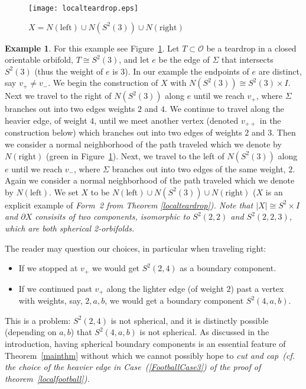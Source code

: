\documentclass[12pt,reqno]{amsart}
\theoremstyle{plain}
\theoremstyle{definition}
\numberwithin{subcase}{case}
\theoremstyle{plain}
\theoremstyle{definition}
\newtheorem{ex}[thm]{Example}
\def\scl[#1][#2]{{\scalebox{#1}{#2}}}
\def\vpp{v_{++}}
\def\vp{v_{+}}
\def\vm{v_{-}}
\newcommand{\OO}{\mathcal{O}}
\begin{document}
\begin{figure}[h!]
\psfrag{s}{\scl[.7][$T \cong S^2\left(3\right)$]}
\psfrag{2}{\scl[.7][$2$]}
\psfrag{3}{\scl[.7][$3$]}
\psfrag{4}{\scl[.7][$4$]}
\psfrag{r}{\scl[.7][$N\left(\text{right}\right)$]}
\psfrag{l}{\scl[.7][$N\left(\text{left}\right)$]}
\centerline{\texttt{[image: localteardrop.eps]}}
\caption{$X=N\left(\text{left}\right)\cup 
N\left(S^{2}(3)\right)
\cup N\left(\text{right}\right)$}
\label{teardropex}
\end{figure}
\begin{ex}
For this example see Figure~\ref{teardropex}. 
Let \(T \subset \OO\) be a teardrop in a closed orientable orbifold, \(T \cong S^{2}(3)\), and let \(e\) be the edge of \(\Sigma\) that intersects \(S^{2}(3)\) (thus the weight of \(e\) is 3).  In our example the endpoints of \(e\) are distinct, say \(\vp \neq \vm\).
We begin the construction of \(X\) with \(N\left(S^{2}(3)\right) \cong S^{2}(3) \times I\).  Next we travel to the right of $N\left(S^{2}(3)\right)$ along $e$ until we reach \(\vp\), where \(\Sigma\) branches out into two edges weights $2$ and $4$. We continue to travel along the heavier edge, of weight $4$, until we meet another vertex 
(denoted \(\vpp\) in the construction below) 
which branches out into two edges of weights $2$ and $3$.
Then we consider a normal neighborhood of the path traveled which we denote by $N(\text{right})$ (green in Figure~\ref{teardropex}). Next, we travel to the left of $N\left(S^{2}(3)\right)$ along $e$ until we reach \(\vm\), where \(\Sigma\) branches out into two edges of the same weight, $2$. Again we consider a normal neighborhood of the path traveled which we denote by $N(\text{left})$.
We set $X$ to be $N(\text{left}) \cup N\left(S^{2}(3)\right) \cup N(\text{right})$ (\(X\) is an explicit example of \em Form~2 \em from Theorem \ref{localteardrop}). Note that $|X| \cong S^2\times I$ and $\partial X$ consisits of two components, isomorphic to $S^2(2,2)$ and $S^2(2,2,3)$, which are both spherical 2-orbifolds.  

The reader may question our choices, in particular when traveling right: 
\begin{itemize}
\item If we stopped at \(\vp\) we would get  \(S^{2}(2,4)\) as a boundary component.
\item If we continued past \(\vp\) along the lighter edge (of weight \(2\)) past a vertex with weights, say, \(2,a,b\), we would get a boundary component \(S^{2}(4,a,b)\).  
\end{itemize}
This is a problem: \(S^{2}(2,4)\) is not spherical, and it is distinctly possible (depending on \(a,b\)) that \(S^{2}(4,a,b)\) is not spherical.  As discussed in the introduction, having spherical boundary components is an essential feature of Theorem~\ref{mainthm} without which we cannot possibly hope to \em cut and cap\em\ ({\it cf.} the choice of the heavier edge in Case~(\ref{FootballCase3}) of the proof of theorem~\ref{localfootball}).
\label{example}
\end{ex}
\end{document}
